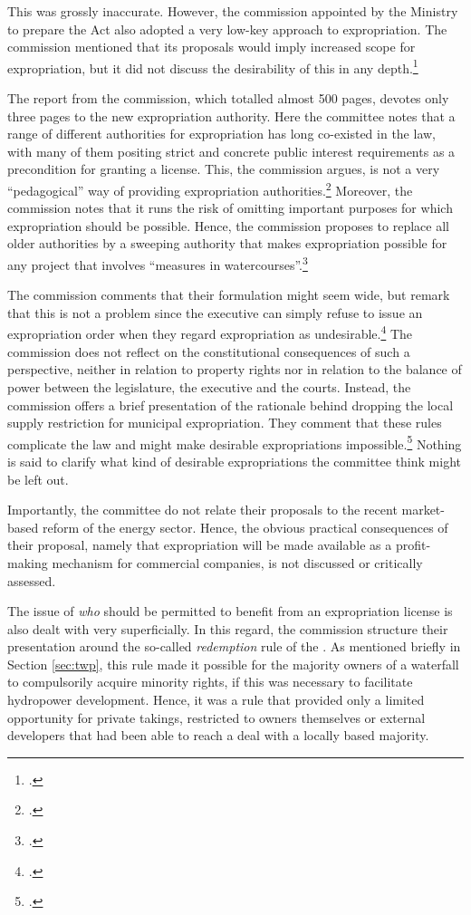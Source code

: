 This was grossly inaccurate. However, the commission appointed by the Ministry to prepare the Act also adopted a very low-key approach to expropriation. The commission mentioned that its proposals would imply increased scope for expropriation, but it did not discuss the desirability of this in any depth.\footcite[235-237]{nou94} 

The report from the commission, which totalled almost 500 pages, devotes only three pages to the new expropriation authority. Here the committee notes that a range of different authorities for expropriation has long co-existed in the law, with many of them positing strict and concrete public interest requirements as a precondition for granting a license. This, the commission argues, is not a very ``pedagogical'' way of providing expropriation authorities.\footcite[235]{nou94} Moreover, the commission notes that it runs the risk of omitting important purposes for which expropriation should be possible. Hence, the commission proposes to replace all older authorities by a sweeping authority that makes expropriation possible for any project that involves ``measures in watercourses''.\footcite[235-236]{nou94}

The commission comments that their formulation might seem wide, but remark that this is not a problem since the executive can simply refuse to issue an expropriation order when they regard expropriation as undesirable.\footcite[235]{nou94} The commission does not reflect on the  constitutional consequences of such a perspective, neither in relation to property rights nor in relation to the balance of power between the legislature, the executive and the courts. Instead, the commission offers a brief presentation of the rationale behind dropping the local supply restriction for municipal expropriation. They comment that these rules complicate the law and might make desirable expropriations impossible.\footcite[235]{nou94} Nothing is said to clarify what kind of desirable expropriations the committee think might be left out. 

Importantly, the committee do not relate their proposals to the recent market-based reform of the energy sector. Hence, the obvious practical consequences of their proposal, namely that expropriation will be made available as a profit-making mechanism for commercial companies, is not discussed or critically assessed.

The issue of {\it who} should be permitted to benefit from an expropriation license is also dealt with very superficially. In this regard, the commission structure their presentation around the so-called {\it redemption} rule of the \cite{wra40}. As mentioned briefly in Section \ref{sec:twp}, this rule made it possible for the majority owners of a waterfall to compulsorily acquire minority rights, if this was necessary to facilitate hydropower development. Hence, it was a rule that provided only a limited opportunity for private takings, restricted to owners themselves or external developers that had been able to reach a deal with a locally based majority.

